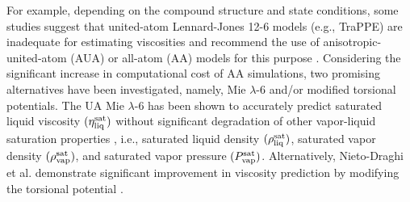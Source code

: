 \documentclass[preprint,review,12pt]{elsarticle}
\begin{document}
	For example, depending on the compound structure and state conditions, some studies suggest that united-atom Lennard-Jones 12-6 models (e.g., TraPPE) are inadequate for estimating viscosities and recommend the use of anisotropic-united-atom (AUA) or all-atom (AA) models for this purpose \cite{Allen1997,Payal2012,Mondello1997,Ungerer2007}. Considering the significant increase in computational cost of AA simulations, two promising alternatives have been investigated, namely, Mie $\lambda$-6 and/or modified torsional potentials. The UA Mie $\lambda$-6 has been shown to accurately predict saturated liquid viscosity $(\eta_{\rm liq}^{\rm sat})$ without significant degradation of other vapor-liquid saturation properties \cite{Gordon2006}, i.e., saturated liquid density $(\rho_{\rm liq}^{\rm sat})$, saturated vapor density $(\rho_{\rm vap}^{\rm sat})$, and saturated vapor pressure $(P_{\rm vap}^{\rm sat})$. Alternatively, Nieto-Draghi et al. demonstrate significant improvement in viscosity prediction by modifying the torsional potential \cite{Nieto2006}.  
	
	
	
	
\end{document}
